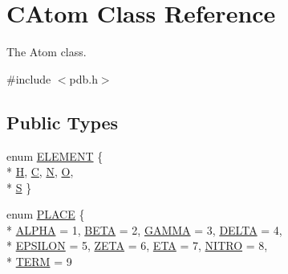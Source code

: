 \hypertarget{classCAtom}{\section{C\-Atom Class Reference}
\label{classCAtom}
}


The Atom class.  




{\ttfamily \#include $<$pdb.\-h$>$}

\subsection*{Public Types}
\begin{DoxyCompactItemize}
\item 
enum \hyperlink{classCAtom_a79e729b143961179c43939392d704848}{E\-L\-E\-M\-E\-N\-T} \{ \\*
\hyperlink{classCAtom_a79e729b143961179c43939392d704848abf99f6f070bd255d3d610b6ec34f13b2}{H}, 
\hyperlink{classCAtom_a79e729b143961179c43939392d704848a6e700b53b49716ee00aa07e562cd7f43}{C}, 
\hyperlink{classCAtom_a79e729b143961179c43939392d704848ad8dcecc0b02940db05ebb15dd382a225}{N}, 
\hyperlink{classCAtom_a79e729b143961179c43939392d704848a5031f6d781302d5217fa84699f5a6439}{O}, 
\\*
\hyperlink{classCAtom_a79e729b143961179c43939392d704848a2fedd9d99a80c0ce9141da1e46aec6c2}{S}
 \}
\item 
enum \hyperlink{classCAtom_a1a65c02a5c158f4de46b2f09aca927d9}{P\-L\-A\-C\-E} \{ \\*
\hyperlink{classCAtom_a1a65c02a5c158f4de46b2f09aca927d9aad7b6332fea08a5789f1f19ea460dd26}{A\-L\-P\-H\-A} =  1, 
\hyperlink{classCAtom_a1a65c02a5c158f4de46b2f09aca927d9a23163e44dfb093c96e3cb25d46b0f3f5}{B\-E\-T\-A} =  2, 
\hyperlink{classCAtom_a1a65c02a5c158f4de46b2f09aca927d9a4d739e0e596e996f279020c74910c9f1}{G\-A\-M\-M\-A} =  3, 
\hyperlink{classCAtom_a1a65c02a5c158f4de46b2f09aca927d9a41e1c786994c3f1bfc8003bab4e3b81c}{D\-E\-L\-T\-A} =  4, 
\\*
\hyperlink{classCAtom_a1a65c02a5c158f4de46b2f09aca927d9a942f75b14dd49c66e6435213b6c4b226}{E\-P\-S\-I\-L\-O\-N} =  5, 
\hyperlink{classCAtom_a1a65c02a5c158f4de46b2f09aca927d9a8ea52803809a1326435b2afae54644e8}{Z\-E\-T\-A} =  6, 
\hyperlink{classCAtom_a1a65c02a5c158f4de46b2f09aca927d9aa1363abbf67695b4952e95201b2c4e3c}{E\-T\-A} =  7, 
\hyperlink{classCAtom_a1a65c02a5c158f4de46b2f09aca927d9ab284bdb8f4606f7afd759511b961e3b1}{N\-I\-T\-R\-O} =  8, 
\\*
\hyperlink{classCAtom_a1a65c02a5c158f4de46b2f09aca927d9abb497da96be0e90f8e8e287cbfcebd63}{T\-E\-R\-M} =  9

\end{DoxyCompactItemize}
